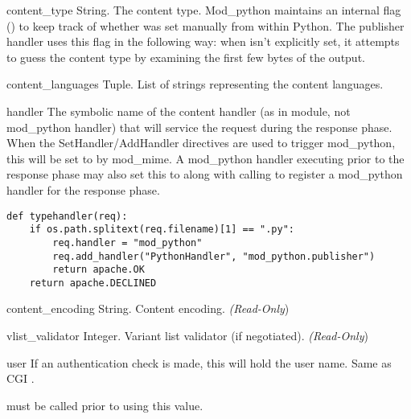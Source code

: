 \begin{memberdesc}[request]{content_type}
  String. The content type. Mod_python maintains an internal flag
  () to keep track of whether
   was set manually from within Python. The
  publisher handler uses this flag in the following way: when
   isn't explicitly set, it attempts to guess the
  content type by examining the first few bytes of the output.
\end{memberdesc}

\begin{memberdesc}[request]{content_languages}
  Tuple. List of strings representing the content languages. 
\end{memberdesc}

\begin{memberdesc}[request]{handler}
  The symbolic name of the content handler (as in module, not mod_python
  handler) that will service the request during the response phase. When
  the SetHandler/AddHandler directives are used to trigger mod_python, this
  will be set to  by mod_mime. A mod_python handler executing
  prior to the response phase may also set this to  along
  with calling  to register a mod_python handler
  for the response phase.

  \begin{verbatim}
def typehandler(req):
    if os.path.splitext(req.filename)[1] == ".py":
        req.handler = "mod_python"
        req.add_handler("PythonHandler", "mod_python.publisher")
        return apache.OK
    return apache.DECLINED
  \end{verbatim}                              

\end{memberdesc}

\begin{memberdesc}[request]{content_encoding}
  String. Content encoding.
  \emph{(Read-Only})
\end{memberdesc}

\begin{memberdesc}[request]{vlist_validator}
  Integer. Variant list validator (if negotiated).
  \emph{(Read-Only})
\end{memberdesc}

\begin{memberdesc}[request]{user}
  If an authentication check is made, this will hold the user
  name. Same as CGI .
  \begin{notice}
     must be called prior to using this value.
  \end{notice}
\end{memberdesc}

